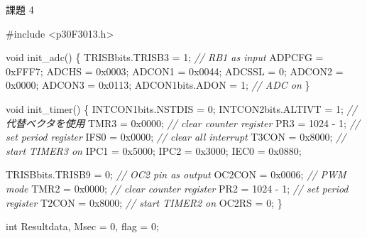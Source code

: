 \documentclass[9pt,a4paper,]{ltjsarticle}
\newenvironment{Shaded}{}{}
\newcommand{\BaseNTok}[1]{\textcolor[rgb]{0.25,0.63,0.44}{#1}}
\newcommand{\CommentTok}[1]{\textcolor[rgb]{0.38,0.63,0.69}{\textit{#1}}}
\newcommand{\DataTypeTok}[1]{\textcolor[rgb]{0.56,0.13,0.00}{#1}}
\newcommand{\DecValTok}[1]{\textcolor[rgb]{0.25,0.63,0.44}{#1}}
\newcommand{\ImportTok}[1]{#1}
\newcommand{\NormalTok}[1]{#1}
\newcommand{\PreprocessorTok}[1]{\textcolor[rgb]{0.74,0.48,0.00}{#1}}
\begin{document}
\begin{codelisting}

\caption{課題 4}

\hypertarget{lst:awesome-code}{%
\label{lst:awesome-code}}%
\begin{Shaded}
\begin{Highlighting}[numbers=left,,]
\PreprocessorTok{#include }\ImportTok{<p30F3013.h>}

\DataTypeTok{void}\NormalTok{ init_adc() \{}
\NormalTok{  TRISBbits.TRISB3 = }\DecValTok{1}\NormalTok{;  }\CommentTok{// RB1 as input}
\NormalTok{  ADPCFG = }\BaseNTok{0xFFF7}\NormalTok{;}
\NormalTok{  ADCHS = }\BaseNTok{0x0003}\NormalTok{;}
\NormalTok{  ADCON1 = }\BaseNTok{0x0044}\NormalTok{;}
\NormalTok{  ADCSSL = }\DecValTok{0}\NormalTok{;}
\NormalTok{  ADCON2 = }\BaseNTok{0x0000}\NormalTok{;}
\NormalTok{  ADCON3 = }\BaseNTok{0x0113}\NormalTok{;}
\NormalTok{  ADCON1bits.ADON = }\DecValTok{1}\NormalTok{;  }\CommentTok{// ADC on}
\NormalTok{\}}

\DataTypeTok{void}\NormalTok{ init_timer() \{}
\NormalTok{  INTCON1bits.NSTDIS = }\DecValTok{0}\NormalTok{;}
\NormalTok{  INTCON2bits.ALTIVT = }\DecValTok{1}\NormalTok{;  }\CommentTok{// 代替ベクタを使用}
\NormalTok{  TMR3 = }\BaseNTok{0x0000}\NormalTok{;           }\CommentTok{// clear counter register}
\NormalTok{  PR3 = }\DecValTok{1024}\NormalTok{ - }\DecValTok{1}\NormalTok{;          }\CommentTok{// set period register}
\NormalTok{  IFS0 = }\BaseNTok{0x0000}\NormalTok{;           }\CommentTok{// clear all interrupt}
\NormalTok{  T3CON = }\BaseNTok{0x8000}\NormalTok{;          }\CommentTok{// start TIMER3 on}
\NormalTok{  IPC1 = }\BaseNTok{0x5000}\NormalTok{;}
\NormalTok{  IPC2 = }\BaseNTok{0x3000}\NormalTok{;}
\NormalTok{  IEC0 = }\BaseNTok{0x0880}\NormalTok{;}

\NormalTok{  TRISBbits.TRISB9 = }\DecValTok{0}\NormalTok{;  }\CommentTok{// OC2 pin as output}
\NormalTok{  OC2CON = }\BaseNTok{0x0006}\NormalTok{;       }\CommentTok{// PWM mode}
\NormalTok{  TMR2 = }\BaseNTok{0x0000}\NormalTok{;         }\CommentTok{// clear counter register}
\NormalTok{  PR2 = }\DecValTok{1024}\NormalTok{ - }\DecValTok{1}\NormalTok{;        }\CommentTok{// set period register}
\NormalTok{  T2CON = }\BaseNTok{0x8000}\NormalTok{;        }\CommentTok{// start TIMER2 on}
\NormalTok{  OC2RS = }\DecValTok{0}\NormalTok{;}
\NormalTok{\}}

\DataTypeTok{int}\NormalTok{ Resultdata, Msec = }\DecValTok{0}\NormalTok{, flag = }\DecValTok{0}\NormalTok{;}


\end{Highlighting}
\end{Shaded}
\end{codelisting}
\end{document}
